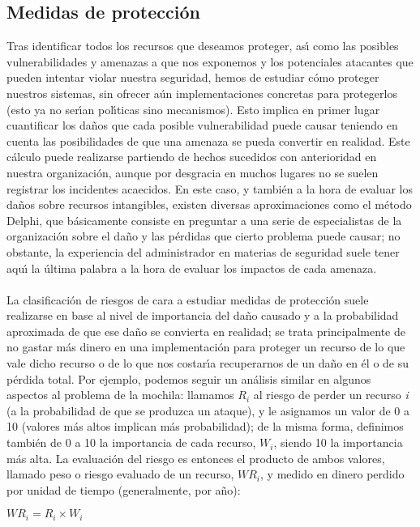 \subsection{Medidas de protecci\'on}
Tras identificar todos los recursos que deseamos proteger, as\'{\i} como las
posibles vulnerabilidades y amenazas a que nos exponemos y los potenciales 
atacantes que pueden intentar violar nuestra seguridad, hemos de estudiar c\'omo
proteger nuestros sistemas, sin ofrecer a\'un implementaciones concretas para
protegerlos (esto ya no ser\'{\i}an pol\'{\i}ticas sino mecanismos). Esto 
implica en primer lugar cuantificar los da\~nos que cada posible vulnerabilidad
puede causar teniendo en cuenta las posibilidades de que una amenaza se pueda
convertir en realidad. Este c\'alculo puede realizarse partiendo de hechos
sucedidos con anterioridad en nuestra organizaci\'on, aunque por desgracia en
muchos lugares no se suelen registrar los incidentes acaecidos. En este caso, y
tambi\'en a la hora de evaluar los da\~nos sobre recursos intangibles, existen
diversas aproximaciones como el m\'etodo Delphi, que b\'asicamente consiste en
preguntar a una serie de especialistas de la organizaci\'on sobre el da\~no y 
las p\'erdidas que cierto problema puede causar; no obstante, la experiencia
del administrador en materias de seguridad suele tener aqu\'{\i} la \'ultima
palabra a la hora de evaluar los impactos de cada amenaza.\\
\\La clasificaci\'on de riesgos de cara a estudiar medidas de protecci\'on 
suele realizarse en base al nivel de importancia del da\~no causado y a la
probabilidad aproximada de que ese da\~no se convierta en realidad; se trata
principalmente de no gastar m\'as dinero en una implementaci\'on para proteger
un recurso de lo que vale dicho recurso o de lo que nos costar\'{\i}a 
recuperarnos
de un da\~no en \'el o de su p\'erdida total. Por ejemplo, podemos seguir un
an\'alisis similar en algunos aspectos al problema de la mochila: llamamos
$R_{i}$ al riesgo de perder un recurso {\it i} (a la probabilidad de que se 
produzca un ataque), y le asignamos un valor de 0 a 10 (valores m\'as altos
implican m\'as probabilidad); de la misma forma, definimos tambi\'en de 0 a 10
la importancia de cada recurso, $W_{i}$, siendo 10 la importancia m\'as alta. 
La evaluaci\'on del riesgo es entonces el producto de ambos valores, llamado
peso o riesgo evaluado de un recurso, $WR_{i}$, y medido en dinero perdido por
unidad de tiempo (generalmente, por a\~no):
\begin{center}
$WR_{i} = R_{i}\times W_{i}$
\end{center}
